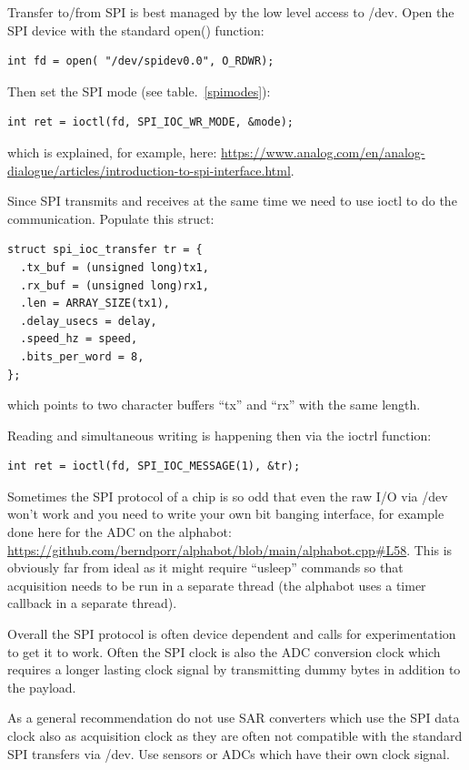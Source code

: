 \documentclass[12pt]{report}
\begin{document}
Transfer to/from SPI is best managed by the low level access to /dev.
Open the SPI device with the standard open() function:
\begin{verbatim}
int fd = open( "/dev/spidev0.0", O_RDWR);
\end{verbatim}

Then set the SPI mode (see table.~\ref{spimodes}):
\begin{verbatim}
int ret = ioctl(fd, SPI_IOC_WR_MODE, &mode);
\end{verbatim}
which is explained, for example, here:
\url{https://www.analog.com/en/analog-dialogue/articles/introduction-to-spi-interface.html}.

Since SPI transmits and receives at the same time we need to
use ioctl to do the communication.
Populate this struct:
\begin{verbatim}
struct spi_ioc_transfer tr = {
  .tx_buf = (unsigned long)tx1,
  .rx_buf = (unsigned long)rx1,
  .len = ARRAY_SIZE(tx1),
  .delay_usecs = delay,
  .speed_hz = speed,
  .bits_per_word = 8,
};
\end{verbatim}
which points to two character buffers ``tx'' and ``rx'' with the
same length.

Reading and simultaneous writing is happening then via the ioctrl
function:
\begin{verbatim}
int ret = ioctl(fd, SPI_IOC_MESSAGE(1), &tr);
\end{verbatim}

Sometimes the SPI protocol of a chip is so odd that even the raw
I/O via /dev won't work and you need to write your own bit banging
interface, for example done here for the ADC on the alphabot:
\url{https://github.com/berndporr/alphabot/blob/main/alphabot.cpp#L58}.
This is obviously far from ideal as it might require ``usleep'' commands
so that acquisition needs to be run in a separate thread (the alphabot
uses a timer callback in a separate thread).

Overall the SPI protocol is often device dependent and calls
for experimentation to get it to work. Often the SPI clock is also
the ADC conversion clock which requires a longer lasting clock signal
by transmitting dummy bytes in addition to the payload.

As a general recommendation do not use SAR converters which use the
SPI data clock also as acquisition clock as they are often not compatible
with the standard SPI transfers via /dev. Use sensors or ADCs which
have their own clock signal.
\end{document}

